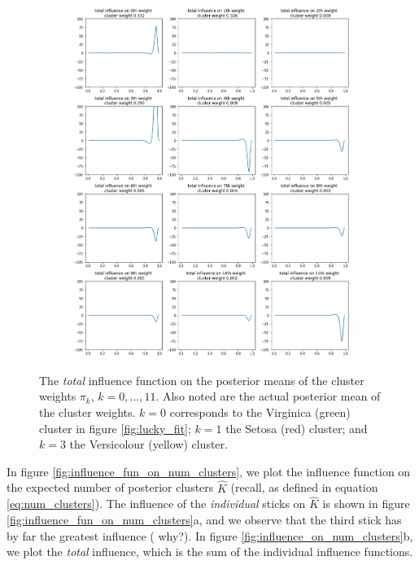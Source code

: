 \documentclass[a4paper]{article}
\begin{document}
\begin{figure}[h!]
	\centering
	\begin{subfigure}[t]{0.6\textwidth}
		\includegraphics[width = \textwidth]{./functional_sensitivity_figs/influence_on_weights.png}
	\end{subfigure}
	\caption{The {\itshape total} influence function on the posterior means of the cluster weights $\pi_k$, $k = 0, ..., 11$.
	Also noted are the actual posterior mean of the cluster weights. $k = 0$ corresponds to the Virginica (green) cluster
	in figure \ref{fig:lucky_fit}; $k = 1$ the Setosa (red) cluster; and $k = 3$ the Versicolour (yellow) cluster. }
	\label{fig:influence_on_weights}
\end{figure}


In figure \ref{fig:influence_fun_on_num_clusters}, we plot the influence function on the expected number of
posterior clusters $\hat K$ (recall, as defined in equation \ref{eq:num_clusters}). The influence of the
{\itshape individual} sticks on $\hat K$ is shown in figure \ref{fig:influence_fun_on_num_clusters}a,
and we observe that the third stick has by far the greatest influence ({\color{red} why?}).
In figure \ref{fig:influence_on_num_clusters}b, we plot the {\itshape total} influence,
which is the sum of the individual influence functions.
\end{document}
